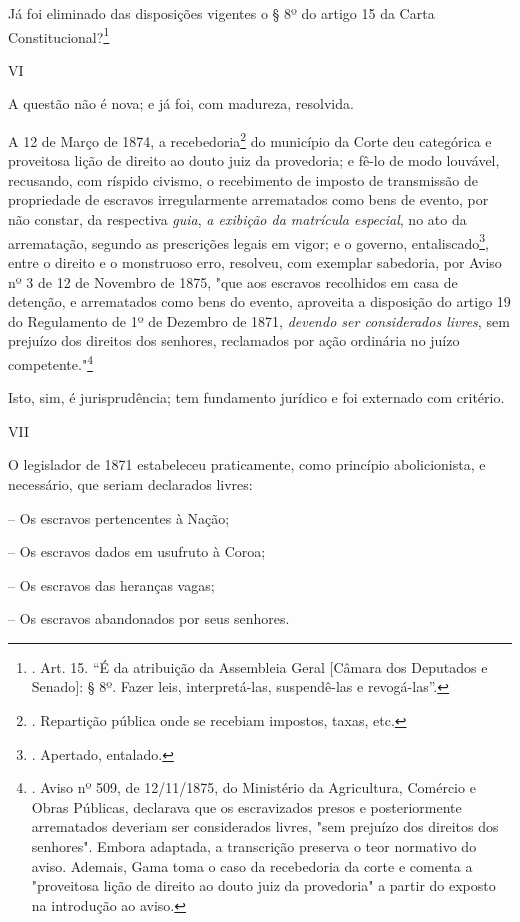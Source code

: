 Já foi eliminado das disposições vigentes o § 8º do artigo 15 da Carta
Constitucional?\footnote{. Art. 15. ``É da atribuição da Assembleia
  Geral {[}Câmara dos Deputados e Senado{]}: § 8º. Fazer leis,
  interpretá-las, suspendê-las e revogá-las''.}

VI

A questão não é nova; e já foi, com madureza, resolvida.

A 12 de Março de 1874, a recebedoria\footnote{. Repartição pública onde
  se recebiam impostos, taxas, etc.} do município da Corte deu
categórica e proveitosa lição de direito ao douto juiz da provedoria; e
fê-lo de modo louvável, recusando, com ríspido civismo, o recebimento de
imposto de transmissão de propriedade de escravos irregularmente
arrematados como bens de evento, por não constar, da respectiva
\emph{guia}, \emph{a exibição da matrícula especial}, no ato da
arrematação, segundo as prescrições legais em vigor; e o governo,
entaliscado\footnote{. Apertado, entalado.}, entre o direito e o
monstruoso erro, resolveu, com exemplar sabedoria, por Aviso nº 3 de 12
de Novembro de 1875, "que aos escravos recolhidos em casa de detenção, e
arrematados como bens do evento, aproveita a disposição do artigo 19 do
Regulamento de 1º de Dezembro de 1871, \emph{devendo ser considerados
livres}, sem prejuízo dos direitos dos senhores, reclamados por ação
ordinária no juízo competente."\footnote{. Aviso nº 509, de 12/11/1875,
  do Ministério da Agricultura, Comércio e Obras Públicas, declarava que
  os escravizados presos e posteriormente arrematados deveriam ser
  considerados livres, "sem prejuízo dos direitos dos senhores". Embora
  adaptada, a transcrição preserva o teor normativo do aviso. Ademais,
  Gama toma o caso da recebedoria da corte e comenta a "proveitosa lição
  de direito ao douto juiz da provedoria" a partir do exposto na
  introdução ao aviso.}

Isto, sim, é jurisprudência; tem fundamento jurídico e foi externado com
critério.

VII

O legislador de 1871 estabeleceu praticamente, como princípio
abolicionista, e necessário, que seriam declarados livres:

-- Os escravos pertencentes à Nação;

-- Os escravos dados em usufruto à Coroa;

-- Os escravos das heranças vagas;

-- Os escravos abandonados por seus senhores.


